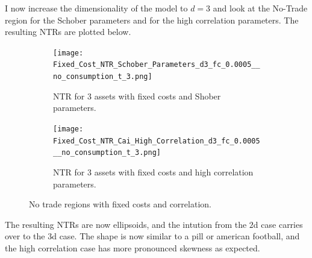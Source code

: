 \documentclass[11pt]{article}
\begin{document}
I now increase the dimensionality of the model to $d = 3$ and look at the No-Trade region for the Schober parameters and for the high correlation parameters.
The resulting \ac{NTR}s are plotted below.
\begin{figure}[!ht]
    \centering
    \begin{subfigure}[t]{0.48\textwidth}
        \centering
        \texttt{[image: Fixed\_Cost\_NTR\_Schober\_Parameters\_d3\_fc\_0.0005\_\_no\_consumption\_t\_3.png]}
        \caption{NTR for 3 assets with fixed costs and Shober parameters.}
        \label{fig: NTR_Fixed_3d_Shober}
    
    \end{subfigure}%
    \hfill
    \begin{subfigure}[t]{0.48\textwidth}
        \centering
        \texttt{[image: Fixed\_Cost\_NTR\_Cai\_High\_Correlation\_d3\_fc\_0.0005\_\_no\_consumption\_t\_3.png]}
        \caption{NTR for 3 assets with fixed costs and high correlation parameters.}
        \label{fig: NTR_Fixed_3d_high_correlation}
    \end{subfigure}
    \caption{No trade regions with fixed costs and correlation.}
\end{figure}
The resulting NTRs are now ellipsoids, and the intution from the $2$d case carries over to the $3$d case.
The shape is now similar to a pill or american football, and the high correlation case has more pronounced skewness as expected.
\end{document}
